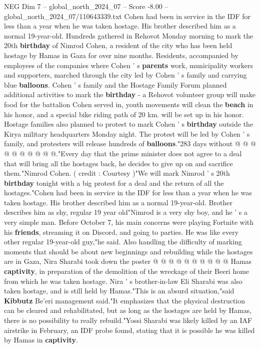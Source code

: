\begin{textsample}{NEG Dim 7 – global\_north\_2024\_07 – Score -8.00 – global\_north\_2024\_07/110643339.txt}  \label{ex:f7_neg_113}
Cohen had been in service in the IDF for less than a year when he was taken hostage.
His brother described him as a normal 19-year-old.
Hundreds gathered in Rehovot Monday morning to mark the 20th \textbf{birthday} of Nimrod Cohen, a resident of the city who has been held hostage by Hamas in Gaza for over nine months.
Residents, accompanied by employees of the companies where Cohen ' s \textbf{parents} work, municipality workers and supporters, marched through the city led by Cohen ' s family and carrying blue \textbf{balloons}.
Cohen ' s family and the Hostage Family Forum planned additional activities to mark the \textbf{birthday} - a Rehovot volunteer group will make food for the battalion Cohen served in, youth movements will clean the \textbf{beach} in his honor, and a special bike riding path of 20 km. will be set up in his honor.
Hostage families also planned to protest to mark Cohen ' s \textbf{birthday} outside the Kirya military headquarters Monday night.
The protest will be led by Cohen ' s family, and protesters will release hundreds of \textbf{balloons}."283 days without @ @ @ @ @ @ @ @ @ @."Every day that the prime minister does not agree to a deal that will bring all the hostages back, he decides to give up on and sacrifice them."Nimrod Cohen. ( credit : Courtesy )"We will mark Nimrod ' s 20th \textbf{birthday} tonight with a big protest for a deal and the return of all the hostages."Cohen had been in service in the IDF for less than a year when he was taken hostage.
His brother described him as a normal 19-year-old.
Brother describes him as shy, regular 19 year old"Nimrod is a very shy boy, and he ' s a very simple man.
Before October 7, his main concerns were playing Fortnite with his \textbf{friends}, streaming it on Discord, and going to parties.
He was like every other regular 19-year-old guy,"he said.
Also handling the difficulty of marking moments that should be about new beginnings and rebuilding while the hostages are in Gaza, Nira Sharabi took down the poster @ @ @ @ @ @ @ @ @ @ Hamas \textbf{captivity}, in preparation of the demolition of the wreckage of their Beeri home from which he was taken hostage.
Nira ' s brother-in-law Eli Sharabi was also taken hostage, and is still held by Hamas."This is an absurd situation,"said \textbf{Kibbutz} Be'eri management said."It emphasizes that the physical destruction can be cleared and rehabilitated, but as long as the hostages are held by Hamas, there is no possibility to really rebuild."Yossi Sharabi was likely killed by an IAF airstrike in February, an IDF probe found, stating that it is possible he was killed by Hamas in \textbf{captivity}.

\end{textsample}
